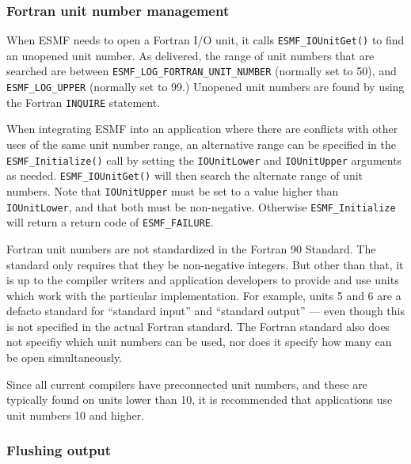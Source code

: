 

\subsubsection{Fortran unit number management}

When ESMF needs to open a Fortran I/O unit, it calls {\tt ESMF\_IOUnitGet()} to find
an unopened unit number.  As delivered, the range of unit numbers that are
searched are between {\tt ESMF\_LOG\_FORTRAN\_UNIT\_NUMBER} (normally set to
50), and {\tt ESMF\_LOG\_UPPER} (normally set to 99.)
Unopened unit numbers are found by using the Fortran {\tt INQUIRE} statement.

When integrating ESMF into an application where there are conflicts with
other uses of the same unit number range, an alternative range can be specified
in the {\tt ESMF\_Initialize()} call by setting the {\tt IOUnitLower} and {\tt IOUnitUpper}
arguments as needed.  {\tt ESMF\_IOUnitGet()} will then search the alternate range
of unit numbers.  Note that {\tt IOUnitUpper} must be set to a value higher than
{\tt IOUnitLower}, and that both must be non-negative.  Otherwise {\tt ESMF\_Initialize}
will return a return code of {\tt ESMF\_FAILURE}.

Fortran unit numbers are not standardized in the Fortran 90 Standard.  The standard
only requires that they be non-negative integers.  But other than that, it is
up to the compiler writers and application developers to provide and
use units which work with the particular implementation.  For example,
units 5 and 6 are a defacto standard for ``standard input'' and
``standard output'' --- even though this is not specified in the actual Fortran
standard.  The Fortran standard also does not specifiy which unit numbers can
be used, nor does it specify how many can be open simultaneously.

Since all current compilers have preconnected unit numbers, and these are
typically found on units lower than 10, it is recommended that applications
use unit numbers 10 and higher.

\subsubsection{Flushing output}

